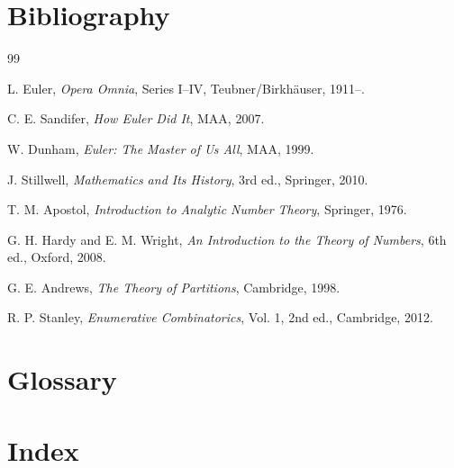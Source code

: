 \documentclass[11pt,a4paper,twoside]{book}
\theoremstyle{eulerstyle}
\theoremstyle{definition}
\begin{document}
\cleardoublepage

\backmatter

\chapter*{Bibliography}

\begin{thebibliography}{99}

L. Euler, \textit{Opera Omnia}, Series I--IV, Teubner/Birkh\"auser, 1911--.

C. E. Sandifer, \textit{How Euler Did It}, MAA, 2007.

W. Dunham, \textit{Euler: The Master of Us All}, MAA, 1999.

J. Stillwell, \textit{Mathematics and Its History}, 3rd ed., Springer, 2010.

T. M. Apostol, \textit{Introduction to Analytic Number Theory}, Springer, 1976.

G. H. Hardy and E. M. Wright, \textit{An Introduction to the Theory of Numbers}, 6th ed., Oxford, 2008.

G. E. Andrews, \textit{The Theory of Partitions}, Cambridge, 1998.

R. P. Stanley, \textit{Enumerative Combinatorics}, Vol. 1, 2nd ed., Cambridge, 2012.

\end{thebibliography}

\cleardoublepage

\chapter*{Glossary}


\cleardoublepage

\chapter*{Index}
\end{document}
